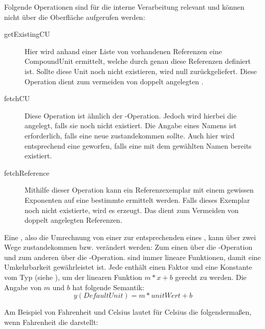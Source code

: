 Folgende Operationen sind für die interne Verarbeitung relevant und können nicht über die Oberfläche aufgerufen werden:
\begin{description}

\item[getExistingCU]
Hier wird anhand einer Liste von vorhandenen Referenzen eine CompoundUnit ermittelt, welche durch genau diese Referenzen definiert ist. Sollte diese Unit noch nicht existieren, wird null zurückgeliefert. Diese Operation dient zum vermeiden von doppelt angelegten .
\item[fetchCU]
Diese Operation ist ähnlich der -Operation. Jedoch wird hierbei die  angelegt, falls sie noch nicht existiert. Die Angabe eines Namens ist erforderlich, falls eine neue  zustandekommen sollte. Auch hier wird entsprechend eine  geworfen, falls eine  mit dem gewählten Namen bereits existiert.
\item[fetchReference]
Mithilfe dieser Operation kann ein Referenzexemplar mit einem gewissen Exponenten auf eine bestimmte  ermittelt werden. Falls dieses Exemplar noch nicht existierte, wird es erzeugt. Das dient zum Vermeiden von doppelt angelegten Referenzen.
\end{description}

\label{ConversionsKapitel} 


Eine , also die Umrechnung von einer  zur entsprechenden  eines , kann über zwei Wege zustandekommen bzw. verändert werden: Zum einen über die -Operation und zum anderen über die -Operation.
 sind immer lineare Funktionen, damit eine Umkehrbarkeit gewährleistet ist. Jede  enthält einen Faktor und eine Konstante vom Typ  (siehe ), um der linearen Funktion $m*x+b$ gerecht zu werden. 
Die Angabe von $m$ und $b$ hat folgende Semantik: 
\[y (DefaultUnit) = m * unitWert + b\]


Am Beispiel von Fahrenheit und Celsius lautet für Celsius die  folgendermaßen, wenn Fahrenheit die  darstellt:

